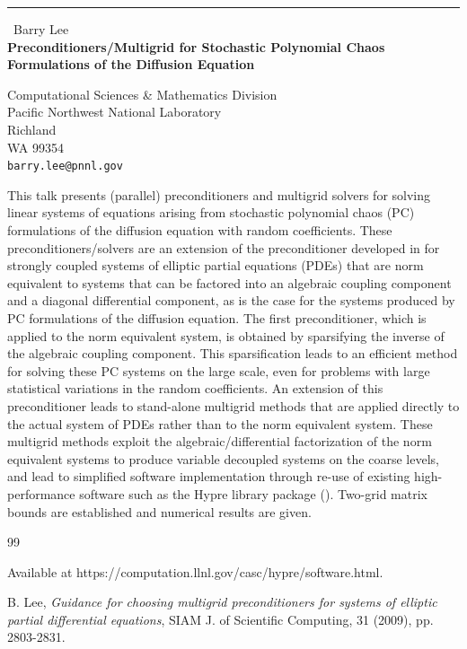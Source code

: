 \documentclass{report}
\begin{document}
\begin{center}
\rule{6in}{1pt} \
{\large Barry Lee \\
{\bf Preconditioners/Multigrid for Stochastic Polynomial Chaos Formulations of the Diffusion Equation}}

Computational Sciences & Mathematics Division \\ Pacific Northwest National Laboratory \\ Richland \\ WA 99354
\\
{\tt barry.lee@pnnl.gov}\end{center}

This talk presents (parallel) preconditioners and multigrid solvers for
solving linear systems of equations arising from stochastic polynomial
chaos (PC) formulations of the diffusion equation with random
coefficients. These preconditioners/solvers are an extension of the
preconditioner developed in \cite{Lee3} for strongly coupled systems of
elliptic partial equations
(PDEs) that are norm equivalent to systems that can be factored into an
algebraic coupling component and a diagonal differential component, as is
the case for the systems produced by PC formulations of the diffusion
equation. The first preconditioner, which is applied to the norm
equivalent system, is obtained by sparsifying the inverse of the
algebraic coupling component. This sparsification leads to an efficient
method for solving
these PC systems on the large scale, even for problems with large
statistical variations in the random coefficients. An extension of this
preconditioner leads to stand-alone multigrid methods that are applied
directly to the actual system of PDEs rather
than to the norm equivalent system. These multigrid methods exploit the
algebraic/differential factorization of
the norm equivalent systems to produce variable decoupled systems on the
coarse levels, and lead to simplified software implementation through
re-use of existing high-performance software such as the Hypre library
package (\cite{hypre}).
Two-grid matrix bounds are established and numerical results are given.

\begin{thebibliography}{99}

Available at https://computation.llnl.gov/casc/hypre/software.html.

{\sc B. Lee}, {\em Guidance for choosing multigrid preconditioners for
systems of elliptic partial differential equations}, SIAM J. of
Scientific Computing, 31 (2009), pp. 2803-2831.

\end{thebibliography}
\end{document}
